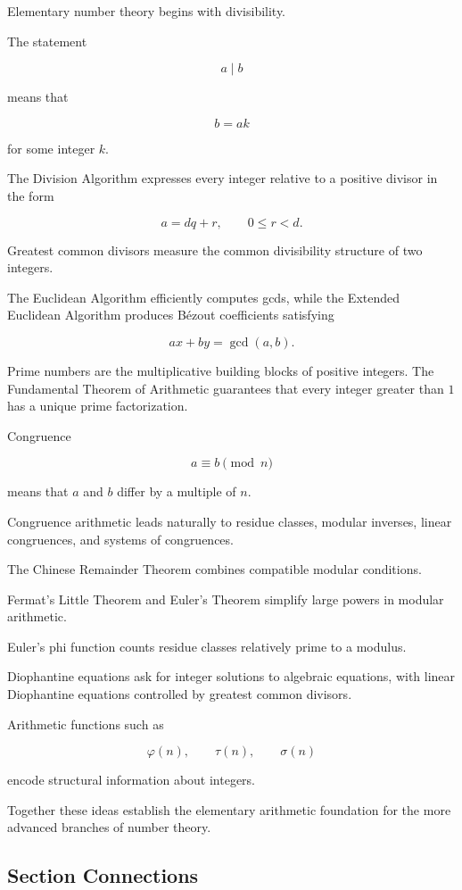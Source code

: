 Elementary number theory begins with divisibility.

The statement

\[ a\mid b \]

means that

\[ b=ak \]

for some integer \(k\).

The Division Algorithm expresses every integer relative to a positive divisor
in the form

\[ a=dq+r,\qquad0\leq r<d. \]

Greatest common divisors measure the common divisibility structure of two
integers.

The Euclidean Algorithm efficiently computes gcds, while the Extended
Euclidean Algorithm produces Bézout coefficients satisfying

\[ ax+by=\gcd(a,b). \]

Prime numbers are the multiplicative building blocks of positive integers.
The Fundamental Theorem of Arithmetic guarantees that every integer greater
than \(1\) has a unique prime factorization.

Congruence

\[ a\equiv b\pmod n \]

means that \(a\) and \(b\) differ by a multiple of \(n\).

Congruence arithmetic leads naturally to residue classes, modular inverses,
linear congruences, and systems of congruences.

The Chinese Remainder Theorem combines compatible modular conditions.

Fermat's Little Theorem and Euler's Theorem simplify large powers in modular
arithmetic.

Euler's phi function counts residue classes relatively prime to a modulus.

Diophantine equations ask for integer solutions to algebraic equations, with
linear Diophantine equations controlled by greatest common divisors.

Arithmetic functions such as

\[ \varphi(n),\qquad\tau(n),\qquad\sigma(n) \]

encode structural information about integers.

Together these ideas establish the elementary arithmetic foundation for the
more advanced branches of number theory.

\subsection{Section Connections}
\label{subsec:elementary-number-theory-connections}

